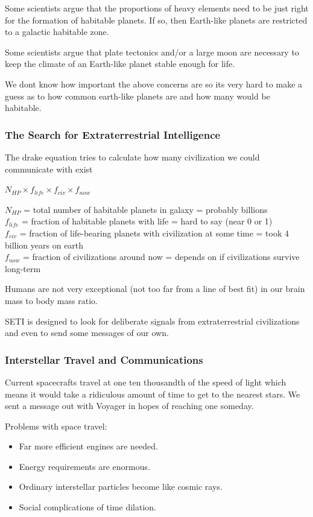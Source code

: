 \documentclass[12pt]{article}
\begin{document}
Some scientists argue that the proportions of heavy elements need to be just right for the formation of habitable planets. If so, then Earth-like planets are restricted to a galactic habitable zone.

Some scientists argue that plate tectonics and/or a large moon are necessary to keep the climate of an Earth-like planet stable enough for life.

We dont know how important the above concerns are so its very hard to make a guess as to how common earth-like planets are and how many would be habitable.

\subsubsection{The Search for Extraterrestrial Intelligence}
The drake equation tries to calculate how many civilization we could communicate with exist
\begin{center}
    $N_{HP} \times f_{life} \times f_{civ} \times f_{now}$
\end{center}
$N_{HP}$ = total number of habitable planets in galaxy = probably billions\\
$f_{life}$ = fraction of habitable planets with life = hard to say (near 0 or 1)\\
$f_{civ}$ = fraction of life-bearing planets with civilization at some time = took 4 billion years on earth \\
$f_{now}$ = fraction of civilizations around now = depends on if civilizations survive long-term

Humans are not very exceptional (not too far from a line of best fit) in our brain mass to body mass ratio.

SETI is designed to look for deliberate signals from extraterrestrial civilizations and even to send some messages of our own.

\subsubsection{Interstellar Travel and Communications}
Current spacecrafts travel at one ten thousandth of the speed of light which means it would take a ridiculous amount of time to get to the nearest stars. We sent a message out with Voyager in hopes of reaching one someday.

Problems with space travel:
\begin{itemize}
\item Far more efficient engines are needed.
\item Energy requirements are enormous.
\item Ordinary interstellar particles become like cosmic rays.
\item Social complications of time dilation.
\end{itemize}
\end{document}
